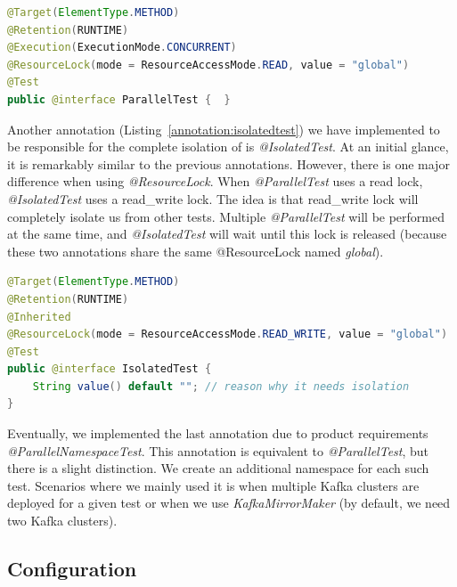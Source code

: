 \begin{lstlisting}[language=Java,label=annotation:paralleltest,caption=Implementation of the @ParallelTest annotation,frame=tb]
@Target(ElementType.METHOD)
@Retention(RUNTIME)
@Execution(ExecutionMode.CONCURRENT)
@ResourceLock(mode = ResourceAccessMode.READ, value = "global")
@Test
public @interface ParallelTest {  }
\end{lstlisting}
Another annotation (Listing~\ref{annotation:isolatedtest}) we have implemented to be responsible for the complete isolation of is \emph{@IsolatedTest}.
At an initial glance, it is remarkably similar to the previous annotations.
However, there is one major difference when using \emph{@ResourceLock}.
When \emph {@ParallelTest} uses a read lock, \emph{@IsolatedTest} uses a read\_write lock.
The idea is that read\_write lock will completely isolate us from other tests.
Multiple \emph{@ParallelTest} will be performed at the same time, and \emph{@IsolatedTest} will wait until this lock is
released (because these two annotations share the same @ResourceLock named \emph{global}).

\begin{lstlisting}[language=Java,label=annotation:isolatedtest,caption=Implementation of the @IsolatedTest annotation,frame=tb]
@Target(ElementType.METHOD)
@Retention(RUNTIME)
@Inherited
@ResourceLock(mode = ResourceAccessMode.READ_WRITE, value = "global")
@Test
public @interface IsolatedTest {
    String value() default ""; // reason why it needs isolation
}
\end{lstlisting}
Eventually, we implemented the last annotation due to product requirements \emph{@ParallelNamespaceTest}.
This annotation is equivalent to \emph{@ParallelTest}, but there is a slight distinction.
We create an additional namespace for each such test.
Scenarios where we mainly used it is when multiple Kafka clusters are deployed for a given test or when we use \emph{KafkaMirrorMaker} (by default, we need two Kafka clusters).

\subsection{Configuration}
\label{05:sub:sec:configuration}

